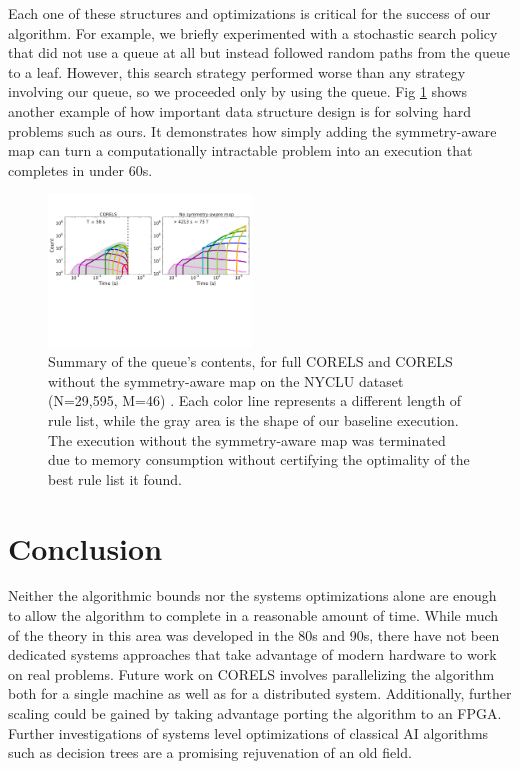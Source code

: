 \documentclass[format=sigconf]{acmart}
\begin{document}
Each one of these structures and optimizations is critical for the success of our algorithm.
For example, we briefly experimented with a stochastic search policy that did not use a queue at all but instead followed random paths from the queue to a leaf.
However, this search strategy performed worse than any strategy involving our queue, so we proceeded only by using the queue.
Fig \ref{fig:ablation} shows another example of how important data structure design is for solving hard problems such as ours.
It demonstrates how simply adding the symmetry-aware map can turn a computationally intractable problem into an execution that completes in under 60s.

\begin{figure}[t!]
\begin{center}
\includegraphics[trim={4mm 0mm 0mm 0mm}, width=0.48\textwidth]{figs/sysml_ablation-queue.pdf}
\end{center}
\vspace{-5mm}
\caption{Summary of the queue's contents, for full CORELS and CORELS without the symmetry-aware map on the NYCLU dataset (N=29,595, M=46)  \citep{nyclu:2014}.
Each color line represents a different length of rule list, while the gray area is the shape of our baseline execution.
The execution without the symmetry-aware map was terminated due to memory consumption without certifying the optimality of the best rule list it found.
}
\label{fig:ablation}
\end{figure}

\section{Conclusion}
Neither the algorithmic bounds nor the systems optimizations alone are enough to allow the algorithm to complete in a reasonable amount of time.
While much of the theory in this area was developed in the 80s and 90s, there have not been dedicated systems approaches that take advantage of modern hardware to work on real problems.
Future work on CORELS involves parallelizing the algorithm both for a single machine as well as for a distributed system.
Additionally, further scaling could be gained by taking advantage porting the algorithm to an FPGA.
Further investigations of systems level optimizations of classical AI algorithms such as decision trees are a promising rejuvenation of an old field.



\end{document}
